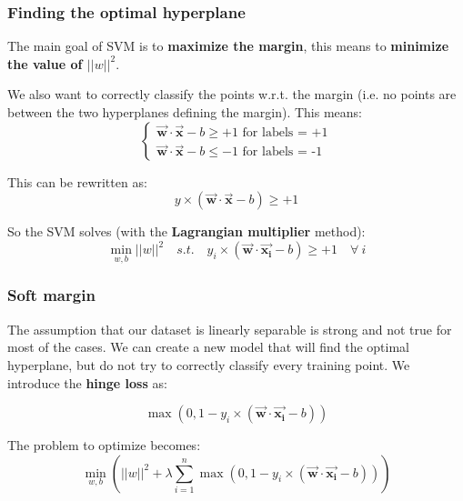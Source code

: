 \documentclass{beamer}
\begin{document}
\begin{frame}
  \frametitle{Finding the optimal hyperplane}
  The main goal of SVM is to \textbf{maximize the margin}, this means to
  \textbf{minimize the value of ${\lvert \lvert w \rvert \rvert}^2$}.

  We also want to correctly classify the points w.r.t. the margin (i.e. no points are between
  the two hyperplanes defining the margin). This means:
  \begin{equation}
    \begin{cases}
      \vec{\boldsymbol{w}} \cdot \vec{\boldsymbol{x}} - b \geq +1
        \text{ for labels = +1}\\
      \vec{\boldsymbol{w}} \cdot \vec{\boldsymbol{x}} - b \leq -1
        \text{ for labels = -1}
    \end{cases}
  \end{equation}

  This can be rewritten as:
  \begin{equation}
    y \times (\vec{\boldsymbol{w}} \cdot \vec{\boldsymbol{x}} - b) \geq +1
  \end{equation}

  So the SVM solves (with the \textbf{Lagrangian multiplier} method):
  \begin{equation}
    \min_{w, b} {\lvert \lvert w \rvert \rvert}^2 \quad s.t. \quad
    y_i \times (\vec{\boldsymbol{w}} \cdot \vec{\boldsymbol{x_i}} - b) \geq +1
    \quad \forall ~i
  \end{equation}
\end{frame}

\begin{frame}
  \frametitle{Soft margin}
  The assumption that our dataset is linearly separable is strong and not true
  for most of the cases. We can create a new model that will find the
  optimal hyperplane, but do not try to correctly classify every training point.
  We introduce the \textbf{hinge loss} as:

  \begin{equation}
    \max (0, 1 - y_i \times
      (\vec{\boldsymbol{w}} \cdot \vec{\boldsymbol{x_i}} - b))
  \end{equation}

  The problem to optimize becomes:
  \begin{equation}
    \min_{w, b} \left( {\lvert \lvert w \rvert \rvert}^2 + \lambda \sum_{i = 1}^n
    \max (0, 1 - y_i \times
      (\vec{\boldsymbol{w}} \cdot \vec{\boldsymbol{x_i}} - b)) \right)
  \end{equation}
\end{frame}
\end{document}
